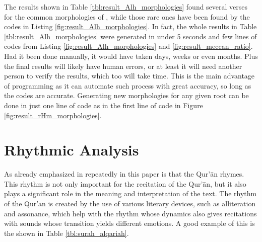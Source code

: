 The results shown in Table \ref{tbl:result_Alh_morphologies} found several verses for the common morphologies of , while those rare ones have been found by the codes in Listing \ref{fig:result_Alh_morphologies}. In fact, the whole results in Table \ref{tbl:result_Alh_morphologies} were generated in under 5 seconds and few lines of codes from Listing \ref{fig:result_Alh_morphologies} and \ref{fig:result_meccan_ratio}. Had it been done manually, it would have taken days, weeks or even months. Plus the final results will likely have human errors, or at least it will need another person to verify the results, which too will take time. This is the main advantage of programming as it can automate such process with great accuracy, so long as the codes are accurate. Generating new morphologies for any given root can be done in just one line of code as in the first line of code in Figure \ref{fig:result_rHm_morphologies}.


\section{Rhythmic Analysis}\label{sec:result_rhythmic_analysis}
As already emphasized in repeatedly in this paper is that the Qur'\=an rhymes. This rhythm is not only important for the recitation of the Qur'\=an, but it also plays a significant role in the meaning and interpretation of the text. The rhythm of the Qur'\=an is created by the use of various literary devices, such as alliteration and assonance, which help with the rhythm whose dynamics also gives recitations with sounds whose transition yields different emotions. A good example of this is the   shown in Table \ref{tbl:surah_alqariah}.

